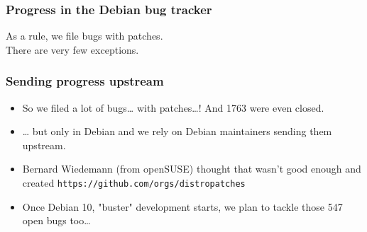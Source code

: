 \documentclass[14pt]{beamer}
\begin{document}
\begin{frame}
 \frametitle{Progress in the Debian bug tracker}
 \begin{center}
  \footnotesize{As a rule, we file bugs with patches. \\
  There are very few exceptions.}
  \vfill
 \end{center}
\end{frame}

\begin{frame}
 \frametitle{Sending progress upstream}
 \begin{itemize}
 \item So we filed a lot of bugs… with patches…! And 1763 were even closed.
 \item … but only in Debian and we rely on Debian maintainers sending them
 upstream.
 \item<2-3> Bernard Wiedemann (from openSUSE) thought that wasn't good enough
 and created \texttt{https://github.com/orgs/distropatches}
 \item<3> Once Debian 10, "buster" development starts, we plan to tackle those 547 open bugs too…
 \end{itemize}
\end{frame}
\end{document}
